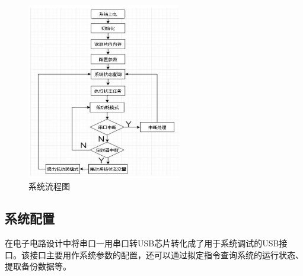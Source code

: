 \begin{figure}[ht]
    \centering
	\includegraphics[width=0.6\textwidth]{fig/系统流程图.png}
	\caption{系统流程图}
	\label{fig:系统流程图}
\end{figure}

\subsection{系统配置}
在电子电路设计中将串口一用串口转USB芯片转化成了用于系统调试的USB接口。该接口主要用作系统参数的配置，还可以通过拟定指令查询系统的运行状态、提取备份数据等。

